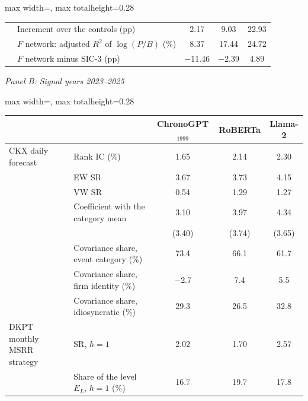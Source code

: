 \begin{table}[htbp]
{\begin{adjustbox}{max width=\linewidth, max totalheight=0.28\textheight}
\begin{tabular}{llccc}
 & Increment over the controls (pp) & \phantom{$-$(0}2.17\phantom{)} & \phantom{$-$(0}9.03\phantom{)} & \phantom{(}22.93\phantom{)} \\
 & $F$ network: adjusted $R^2$ of $\log(P/B)$ (\%) & \phantom{$-$(0}8.37\phantom{)} & \phantom{$-$(}17.44\phantom{)} & \phantom{(}24.72\phantom{)} \\
 & $F$ network minus SIC-3 (pp) & \phantom{(}$-$11.46\phantom{)} & \phantom{(0}$-$2.39\phantom{)} & \phantom{(0}4.89\phantom{)} \\
\bottomrule
\end{tabular}
\end{adjustbox}
\par\medskip
\textit{Panel B: Signal years 2023--2025}\\[2pt]
\begin{adjustbox}{max width=\linewidth, max totalheight=0.28\textheight}
\begin{tabular}{llccc}
\toprule
 &  & ChronoGPT$_{1999}$ & RoBERTa & Llama-2 \\
\midrule
CKX daily forecast & Rank IC (\%) & \phantom{$-$(0}1.65\phantom{)} & \phantom{$-$(0}2.14\phantom{)} & \phantom{(0}2.30\phantom{)} \\
 & EW SR & \phantom{$-$(0}3.67\phantom{)} & \phantom{$-$(0}3.73\phantom{)} & \phantom{(0}4.15\phantom{)} \\
 & VW SR & \phantom{$-$(0}0.54\phantom{)} & \phantom{$-$(0}1.29\phantom{)} & \phantom{(0}1.27\phantom{)} \\
 & Coefficient with the category mean & \phantom{$-$(0}3.10\phantom{)} & \phantom{$-$(0}3.97\phantom{)} & \phantom{(0}4.34\phantom{)} \\
 &  & \phantom{$-$0}(3.40) & \phantom{$-$0}(3.74) & \phantom{0}(3.65) \\
 & Covariance share, event category (\%) & \phantom{$-$(}73.4\phantom{)0} & \phantom{$-$(}66.1\phantom{)0} & \phantom{(}61.7\phantom{)0} \\
 & Covariance share, firm identity (\%) & \phantom{(0}$-$2.7\phantom{)0} & \phantom{$-$(0}7.4\phantom{)0} & \phantom{(0}5.5\phantom{)0} \\
 & Covariance share, idiosyncratic (\%) & \phantom{$-$(}29.3\phantom{)0} & \phantom{$-$(}26.5\phantom{)0} & \phantom{(}32.8\phantom{)0} \\
\midrule
DKPT monthly MSRR strategy & SR, $h=1$ & \phantom{$-$(0}2.02\phantom{)} & \phantom{$-$(0}1.70\phantom{)} & \phantom{(0}2.57\phantom{)} \\
 & Share of the level $E_L$, $h=1$ (\%) & \phantom{$-$(}16.7\phantom{)0} & \phantom{$-$(}19.7\phantom{)0} & \phantom{(}17.8\phantom{)0} \\

\end{tabular}
\end{adjustbox}}
\end{table}
